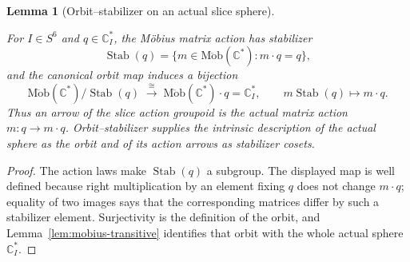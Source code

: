 \documentclass[11pt]{article}
\newcommand{\CC}{\mathbb{C}}
\providecommand{\lean}[1]{}
\providecommand{\uses}[1]{}
\theoremstyle{plain}
\newtheorem{lemma}[theorem]{Lemma}
\theoremstyle{definition}
\theoremstyle{remark}
\begin{document}
\begin{lemma}[Orbit--stabilizer on an actual slice sphere]\label{lem:orbit-stab}
\lean{GreatCircle.actualSphereOrbitEquivQuotientStabilizer,
GreatCircle.actualSphereOrbitEquivQuotientStabilizer_mk,
GreatCircle.actualSphere_moebius_transitive,
MulAction.orbitEquivQuotientStabilizer}
\uses{def:two-worlds, lem:mobius-transitive}
For $I\in S^6$ and $q\in\CC_I^{*}$, the Möbius matrix action has
stabilizer
\[
  \operatorname{Stab}(q)
  =\{m\in\operatorname{M\ddot ob}(\CC^{*}):m\mathbin{\cdot}q=q\},
\]
and the canonical orbit map induces a bijection
\[
 \operatorname{M\ddot ob}(\CC^{*})/\operatorname{Stab}(q)
   \;\xrightarrow{\ \cong\ }\;
 \operatorname{M\ddot ob}(\CC^{*})\mathbin{\cdot}q
   =\CC_I^{*},
 \qquad m\operatorname{Stab}(q)\longmapsto m\mathbin{\cdot}q.
\]
Thus an arrow of the slice action groupoid is the actual matrix action
$m:q\to m\cdot q$. Orbit--stabilizer supplies the intrinsic description of
the actual sphere as the orbit and of its action arrows as stabilizer cosets.
\end{lemma}

\begin{proof}
The action laws make $\operatorname{Stab}(q)$ a subgroup. The displayed map
is well defined because right multiplication by an element fixing $q$ does
not change $m\cdot q$; equality of two images says that the corresponding
matrices differ by such a stabilizer element. Surjectivity is the definition
of the orbit, and Lemma~\ref{lem:mobius-transitive} identifies that orbit
with the whole actual sphere $\CC_I^{*}$.
\end{proof}
\end{document}
